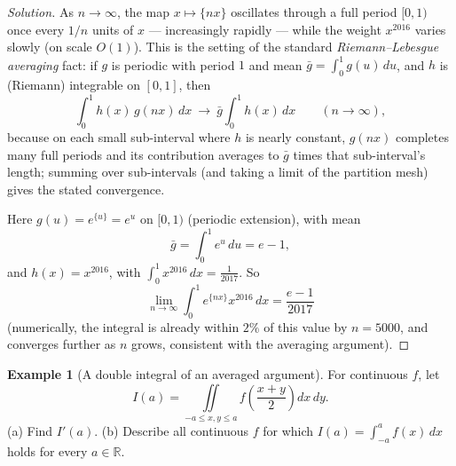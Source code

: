 \documentclass[11pt]{article}
\theoremstyle{definition}
\newtheorem{example}{Example}[section]
\newcommand{\R}{\mathbb{R}}
\begin{document}
\begin{proof}[Solution]
As $n\to\infty$, the map $x\mapsto\{nx\}$ oscillates through a full period $[0,1)$ once every $1/n$ units of $x$ — increasingly rapidly — while the weight $x^{2016}$ varies slowly (on scale $O(1)$). This is the setting of the standard \emph{Riemann–Lebesgue averaging} fact: if $g$ is periodic with period $1$ and mean $\bar g=\int_0^1g(u)\,du$, and $h$ is (Riemann) integrable on $[0,1]$, then
\[
\int_0^1 h(x)\,g(nx)\,dx \ \longrightarrow\ \bar g\int_0^1h(x)\,dx\qquad(n\to\infty),
\]
because on each small sub-interval where $h$ is nearly constant, $g(nx)$ completes many full periods and its contribution averages to $\bar g$ times that sub-interval's length; summing over sub-intervals (and taking a limit of the partition mesh) gives the stated convergence.

Here $g(u)=e^{\{u\}}=e^u$ on $[0,1)$ (periodic extension), with mean
\[
\bar g=\int_0^1 e^u\,du = e-1,
\]
and $h(x)=x^{2016}$, with $\displaystyle\int_0^1x^{2016}\,dx=\frac1{2017}$. So
\[
\lim_{n\to\infty}\int_0^1 e^{\{nx\}}x^{2016}\,dx=\boxed{\frac{e-1}{2017}}
\]
(numerically, the integral is already within $2\%$ of this value by $n=5000$, and converges further as $n$ grows, consistent with the averaging argument).
\end{proof}

\begin{example}[A double integral of an averaged argument]
For continuous $f$, let
\[
I(a)=\iint\limits_{-a\le x,y\le a} f\!\left(\frac{x+y}2\right)dx\,dy.
\]
(a) Find $I'(a)$. (b) Describe all continuous $f$ for which $I(a)=\int_{-a}^a f(x)\,dx$ holds for every $a\in\R$.
\end{example}
\end{document}
